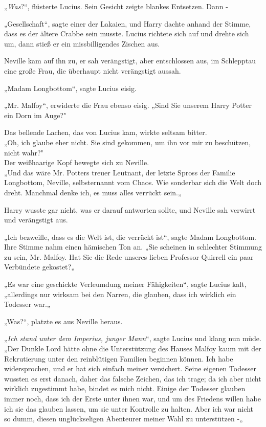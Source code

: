{„\emph{Was}?“, flüsterte Lucius. Sein Gesicht zeigte blankes Entsetzen. Dann -

„Gesellschaft“, sagte einer der Lakaien, und Harry dachte anhand der Stimme, dass es der ältere Crabbe sein musste. Lucius richtete sich auf und drehte sich um, dann stieß er ein missbilligendes Zischen aus.

Neville kam auf ihn zu, er sah verängstigt, aber entschlossen aus, im Schlepptau eine große Frau, die überhaupt nicht verängstigt aussah.

„Madam Longbottom“, sagte Lucius eisig.

„Mr. Malfoy“, erwiderte die Frau ebenso eisig. „Sind Sie unserem Harry Potter ein Dorn im Auge?"

Das bellende Lachen, das von Lucius kam, wirkte seltsam bitter.\\ „Oh, ich glaube eher nicht. Sie sind gekommen, um ihn vor mir zu beschützen, nicht wahr?"\\ Der weißhaarige Kopf bewegte sich zu Neville.\\ „Und das wäre Mr. Potters treuer Leutnant, der letzte Spross der Familie Longbottom, Neville, selbsternannt vom Chaos. Wie sonderbar sich die Welt doch dreht. Manchmal denke ich, es muss alles verrückt sein.„

Harry wusste gar nicht, was er darauf antworten sollte, und Neville sah verwirrt und verängstigt aus.

„Ich bezweifle, dass es die Welt ist, die verrückt ist“, sagte Madam Longbottom. Ihre Stimme nahm einen hämischen Ton an. „Sie scheinen in schlechter Stimmung zu sein, Mr. Malfoy. Hat Sie die Rede unseres lieben Professor Quirrell ein paar Verbündete gekostet?„

„Es war eine geschickte Verleumdung meiner Fähigkeiten“, sagte Lucius kalt,\\ „allerdings nur wirksam bei den Narren, die glauben, dass ich wirklich ein Todesser war.„

„Was?“, platzte es aus Neville heraus.

„\emph{Ich stand unter dem Imperius, junger Mann}“, sagte Lucius und klang nun müde.\\ „Der Dunkle Lord hätte ohne die Unterstützung des Hauses Malfoy kaum mit der Rekrutierung unter den reinblütigen Familien beginnen können. Ich habe widersprochen, und er hat sich einfach meiner versichert. Seine eigenen Todesser wussten es erst danach, daher das falsche Zeichen, das ich trage; da ich aber nicht wirklich zugestimmt habe, bindet es mich nicht. Einige der Todesser glauben immer noch, dass ich der Erste unter ihnen war, und um des Friedens willen habe ich sie das glauben lassen, um sie unter Kontrolle zu halten. Aber ich war nicht so dumm, diesen unglückseligen Abenteurer meiner Wahl zu unterstützen -„

}
